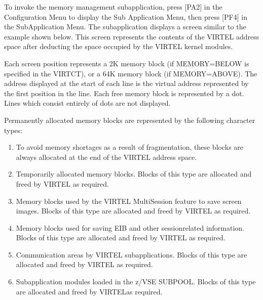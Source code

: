 \documentclass[letterpaper,10pt,english]{sphinxmanual}
\begin{document}
\sphinxAtStartPar
To invoke the memory management sub\sphinxhyphen{}application, press {[}PA2{]} in the Configuration Menu to display the Sub\sphinxhyphen{} Application Menu, then press {[}PF4{]} in the Sub\sphinxhyphen{}Application Menu. The sub\sphinxhyphen{}application displays a screen similar to the example shown below. This screen represents the contents of the VIRTEL address space after deducting the space  occupied by the VIRTEL kernel modules.

\sphinxAtStartPar
{}

\sphinxAtStartPar
{}

\sphinxAtStartPar
Each screen position represents a 2K memory block (if MEMORY=BELOW is specified in the VIRTCT), or a 64K memory block (if MEMORY=ABOVE). The address displayed at the start of each line is the virtual address represented by the first position in the line. Each free memory block is represented by a dot. Lines which consist entirely of dots are not displayed.

\sphinxAtStartPar
Permanently allocated memory blocks are represented by the following character types:
\begin{enumerate}
%
\item {} 
\sphinxAtStartPar
To avoid memory shortages as a result of fragmentation, these blocks are always allocated at the end of the VIRTEL address space.

\item {} 
\sphinxAtStartPar
Temporarily allocated memory blocks. Blocks of this type are allocated and freed by VIRTEL as required.

\item {} 
\sphinxAtStartPar
Memory blocks used by the VIRTEL Multi\sphinxhyphen{}Session feature to save screen images. Blocks of this type are allocated and freed by VIRTEL as required.

\item {} 
\sphinxAtStartPar
Memory blocks used for saving EIB and other session\sphinxhyphen{}related information. Blocks of this type are allocated and freed by VIRTEL as required.

\item {} 
\sphinxAtStartPar
Communication areas by VIRTEL sub\sphinxhyphen{}applications. Blocks of this type are allocated and freed by VIRTEL as required.

\item {} 
\sphinxAtStartPar
Sub\sphinxhyphen{}application modules loaded in the z/VSE SUBPOOL. Blocks of this type are allocated and freed by VIRTELas required.

\end{enumerate}
\end{document}
